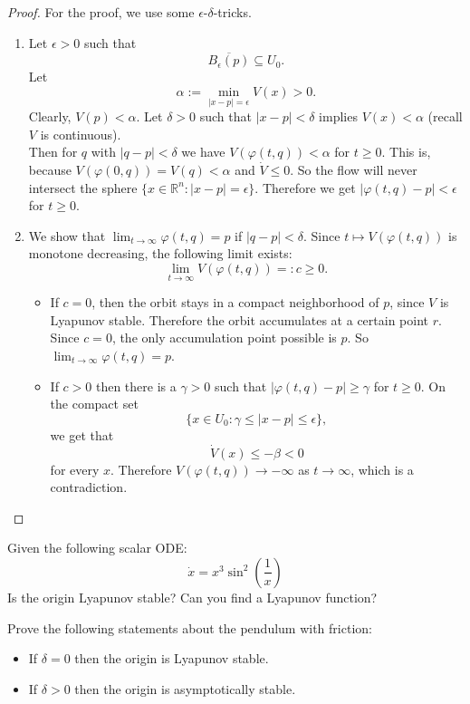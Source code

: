 \documentclass{article}
\newcommand*{\Rn}{{\mathbb{R}^n}}
\newcommand*{\reci}[1]{{\frac{1}{#1}}}
\begin{document}
\begin{proof}
    For the proof, we use some $\epsilon$-$\delta$-tricks.
    \begin{enumerate}
        \item Let $\epsilon > 0$ such that
        $$\overline{B_\epsilon(p)} \subseteq U_0.$$
        Let
        $$\alpha := \min_{|x-p|=\epsilon}V(x) > 0.$$
        Clearly, $V(p)<\alpha$. Let $\delta > 0$ such that $|x-p|<\delta$ implies $V(x) < \alpha$ (recall $V$ is continuous).\\
        Then for $q$ with $|q-p| < \delta$ we have $V(\varphi(t,q))< \alpha$ for $t \geq 0$. This is, because $V(\varphi(0,q)) = V(q) < \alpha$ and $\dot V \leq 0$. So the flow will never intersect the sphere $\{x\in\Rn:|x-p| = \epsilon\}$. Therefore we get $|\varphi(t,q)-p|<\epsilon$ for $t\geq 0$.

        \item We show that $\lim_{t\to\infty}\varphi(t,q) = p$ if $|q-p|<\delta$. Since $t\mapsto V(\varphi(t,q))$ is monotone decreasing, the following limit exists:
        $$\lim_{t\to\infty}V(\varphi(t,q))=:c \geq 0.$$
        \begin{itemize}
            \item If $c = 0$, then the orbit stays in a compact neighborhood of $p$, since $V$ is Lyapunov stable. Therefore the orbit accumulates at a certain point $r$. Since $c = 0$, the only accumulation point possible is $p$. So $\lim_{t\to\infty} \varphi(t,q) = p$.

            \item If $c > 0$ then there is a $\gamma > 0$ such that $|\varphi(t,q)-p|\geq \gamma$ for $t\geq 0$. On the compact set
            $$\{x\in U_0: \gamma \leq |x-p|\leq \epsilon\},$$
            we get that
            $$\dot V(x)\leq -\beta < 0$$
            for every $x$. Therefore $V(\varphi(t,q))\to-\infty$ as $t\to\infty$, which is a contradiction.
        \end{itemize}
    \end{enumerate}
\end{proof}

\begin{hw}
    Given the following scalar ODE:
    $$\dot x = x^3 \sin^2\left(\reci x\right)$$
    Is the origin Lyapunov stable? Can you find a Lyapunov function?
\end{hw}

\begin{hw}
    Prove the following statements about the pendulum with friction:
    \begin{itemize}
        \item If $\delta = 0$ then the origin is Lyapunov stable.

        \item If $\delta > 0$ then the origin is asymptotically stable.
    \end{itemize}
\end{hw}
\end{document}
